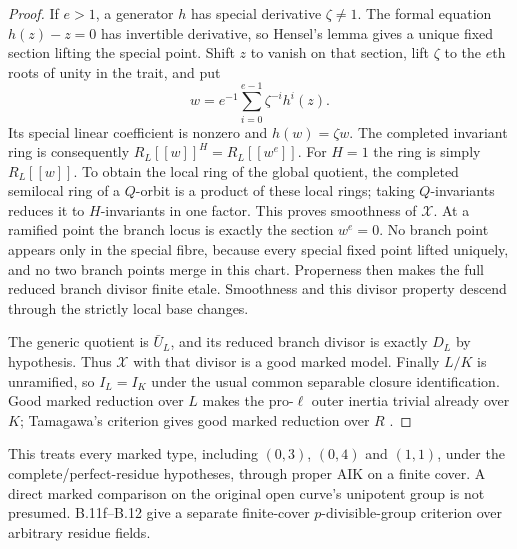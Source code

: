 \begin{proof}
If $e>1$, a generator $h$ has special derivative $\zeta\ne1$.
The formal equation $h(z)-z=0$ has invertible derivative, so Hensel's
lemma gives a unique fixed section lifting the special point. Shift
$z$ to vanish on that section, lift $\zeta$ to the $e$th roots of
unity in the trait, and put
\[
              w=e^{-1}\sum_{i=0}^{e-1}\zeta^{-i}h^i(z).
\]
Its special linear coefficient is nonzero and $h(w)=\zeta w$.
The completed invariant ring is consequently
$R_L[[w]]^H=R_L[[w^e]]$. For $H=1$ the ring is simply $R_L[[w]]$.
To obtain the local ring of the global quotient, the completed
semilocal ring of a $Q$-orbit is a product of these local rings;
taking $Q$-invariants reduces it to $H$-invariants in one factor.
This proves smoothness of $\mathcal X$. At a ramified point the
branch locus is exactly the section $w^e=0$. No branch point appears
only in the special fibre, because every special fixed point lifted
uniquely, and no two branch points merge in this chart. Properness
then makes the full reduced branch divisor finite etale. Smoothness and this
divisor property descend through the strictly local base changes.

The generic quotient is $\bar U_L$, and its reduced branch divisor is
exactly $D_L$ by hypothesis. Thus $\mathcal X$ with that divisor is a
good marked model. Finally $L/K$ is unramified, so $I_L=I_K$ under
the usual common separable closure identification. Good marked
reduction over $L$ makes the pro-$\ell$ outer inertia trivial already
over $K$; Tamagawa's criterion gives good marked reduction over $R$
\citep[Theorem 5.3]{BC_Tamagawa}.
\end{proof}

This treats every marked type, including $(0,3)$, $(0,4)$ and $(1,1)$,
under the complete/perfect-residue hypotheses, through proper AIK on
a finite cover. A direct marked comparison on the original open
curve's unipotent group is not presumed. B.11f--B.12 give a separate
finite-cover $p$-divisible-group criterion over arbitrary residue fields.

